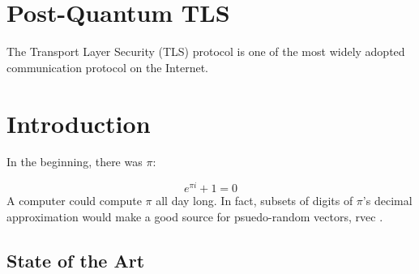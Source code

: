 \documentclass[letterpaper,12pt,titlepage,oneside,final]{book}
\let\origdoublepage\cleardoublepage
\newcommand{\clearemptydoublepage}{%
  \clearpage{\pagestyle{empty}\origdoublepage}}
\let\cleardoublepage\clearemptydoublepage
\begin{document}
\renewcommand*{\abbreviationsname}{List of Abbreviations}
\printglossary[type=abbreviations]
\cleardoublepage
{}		%

\printglossary[type=symbols]
\cleardoublepage
{}		%



\chapter{Post-Quantum TLS}
The Transport Layer Security (TLS) protocol is one of the most widely adopted communication protocol on the Internet.

\chapter{Introduction}
In the beginning, there was $\pi$:

\begin{equation}
   e^{\pi i} + 1 = 0  \label{eqn_pi}
\end{equation}
A \gls{computer} could compute $\pi$ all day long. In fact, subsets of digits of $\pi$'s decimal approximation would make a good source for psuedo-random vectors, \gls{rvec} . 

\section{State of the Art}
\end{document}
